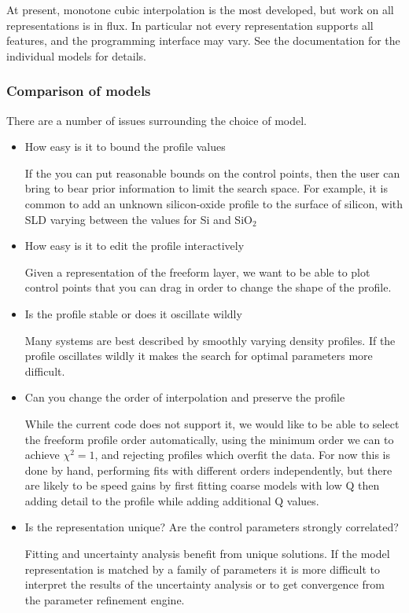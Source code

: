 \documentclass[letterpaper,10pt,english]{sphinxmanual}
\begin{document}
At present, monotone cubic interpolation is the most developed, but work
on all representations is in flux.  In particular not every representation
supports all features, and the programming interface may vary. See the
documentation for the individual models for details.


\subsubsection{Comparison of models}
\label{guide/sample:comparison-of-models}
There are a number of issues surrounding the choice of model.
\begin{itemize}
\item {} 
How easy is it to bound the profile values

If the you can put reasonable bounds on the control points, then the
user can bring to bear prior information to limit the search space.
For example, it is common to add an unknown silicon-oxide profile
to the surface of silicon, with SLD varying between the values for
Si and SiO$_{\text{2}}$

\item {} 
How easy is it to edit the profile interactively

Given a representation of the freeform layer, we want to be able to
plot control points that you can drag in order to change the shape
of the profile.

\item {} 
Is the profile stable or does it oscillate wildly

Many systems are best described by smoothly varying density profiles.
If the profile oscillates wildly it makes the search for optimal
parameters more difficult.

\item {} 
Can you change the order of interpolation and preserve the profile

While the current code does not support it, we would like to be
able to select the freeform profile order automatically, using the
minimum order we can to achieve $\chi^2 = 1$, and rejecting profiles
which overfit the data.  For now this is done by hand, performing
fits with different orders independently, but there are likely to
be speed gains by first fitting coarse models with low Q then adding
detail to the profile while adding additional Q values.

\item {} 
Is the representation unique?  Are the control parameters strongly
correlated?

Fitting and uncertainty analysis benefit from unique solutions.  If
the model representation is matched by a family of parameters it is
more difficult to interpret the results of the uncertainty analysis
or to get convergence from the parameter refinement engine.

\end{itemize}
\end{document}
